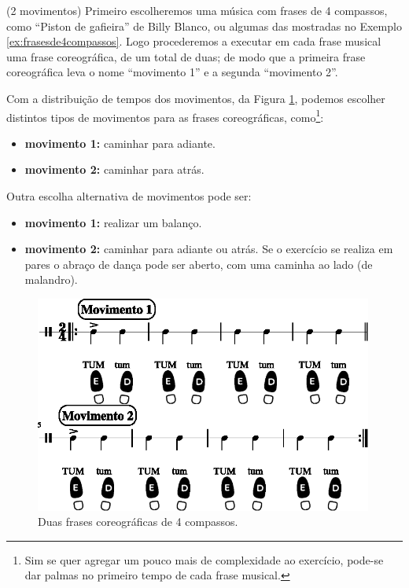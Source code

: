 \begin{example}
\label{ex:usandofrases1}
(2 movimentos)
Primeiro escolheremos uma música com frases de 4 compassos, como ``Piston de gafieira'' de Billy Blanco,
ou algumas das mostradas no Exemplo \ref{ex:frasesde4compassos}.
Logo procederemos a executar em cada frase musical uma frase coreográfica, de um total de duas;
de modo que a primeira frase coreográfica leva o nome ``movimento 1'' e a segunda ``movimento 2''.

Com a distribuição de tempos dos movimentos, da Figura \ref{fig:frasecoreografica0}, 
podemos escolher distintos tipos de movimentos para as frases coreográficas, 
como\footnote{Sim 
se quer agregar um pouco mais de complexidade ao exercício,
pode-se dar palmas no primeiro tempo de cada frase musical.}:
\begin{itemize}
\item \textbf{movimento 1:} caminhar para adiante.
\item \textbf{movimento 2:} caminhar para atrás.
\end{itemize}
Outra  escolha alternativa de movimentos pode ser:
\begin{itemize}
\item \textbf{movimento 1:} realizar um balanço.
\item \textbf{movimento 2:} caminhar para adiante ou atrás. 
Se o exercício se realiza em pares o abraço de dança pode ser aberto, 
com uma caminha ao lado (de malandro). 
\end{itemize}
\end{example}


\begin{figure}[!h]
    \centering
    \includegraphics[width=0.99\textwidth]{chapters/cap-musicalidade/treino-fraseio0-1.eps}
    \caption{Duas frases coreográficas de 4 compassos.}
    \label{fig:frasecoreografica0}
\end{figure}

